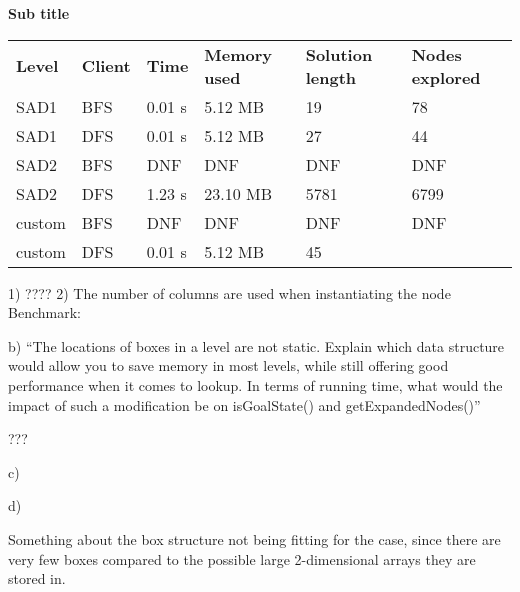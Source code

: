 \documentclass[Main]{subfiles}
\begin{document}
\textbf{Sub title}



\begin{table}[h]
\begin{tabular}{llllll}
\rowcolor[HTML]{EFEFEF} 
\textbf{Level} & \textbf{Client} & \textbf{Time} & \textbf{Memory used} & \textbf{Solution length} & \textbf{Nodes explored} \\
SAD1           & BFS             & 0.01 s        & 5.12 MB              & 19                       & 78                      \\
SAD1           & DFS             & 0.01 s        & 5.12 MB              & 27                       & 44                      \\
SAD2           & BFS             & DNF           & DNF                  & DNF                      & DNF                     \\
SAD2           & DFS             & 1.23 s        & 23.10 MB             & 5781                     & 6799                    \\
custom         & BFS             & DNF           & DNF                  & DNF                      & DNF                     \\
custom         & DFS             & 0.01 s        & 5.12 MB              & 45                       &                        
\end{tabular}
\end{table}



1) ????
2) The number of columns are used when instantiating the node
Benchmark:


b) ``The locations of boxes in a level are not static. Explain which data structure would allow you to save memory in most levels, while still offering good performance when it comes to lookup. In terms of running time, what would the impact of such a modification be on isGoalState() and getExpandedNodes()''

???

c)

d) 

Something about the box structure not being fitting for the case, since there are very few boxes compared to the possible large 2-dimensional arrays they are stored in. 
\end{document}
